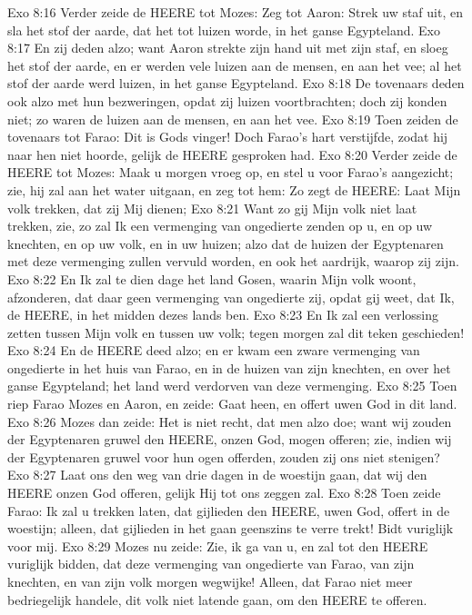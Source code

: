 Exo 8:16  Verder zeide de HEERE tot Mozes: Zeg tot Aaron: Strek uw staf uit, en sla het stof der aarde, dat het tot luizen worde, in het ganse Egypteland.
Exo 8:17  En zij deden alzo; want Aaron strekte zijn hand uit met zijn staf, en sloeg het stof der aarde, en er werden vele luizen aan de mensen, en aan het vee; al het stof der aarde werd luizen, in het ganse Egypteland.
Exo 8:18  De tovenaars deden ook alzo met hun bezweringen, opdat zij luizen voortbrachten; doch zij konden niet; zo waren de luizen aan de mensen, en aan het vee.
Exo 8:19  Toen zeiden de tovenaars tot Farao: Dit is Gods vinger! Doch Farao's hart verstijfde, zodat hij naar hen niet hoorde, gelijk de HEERE gesproken had.
Exo 8:20  Verder zeide de HEERE tot Mozes: Maak u morgen vroeg op, en stel u voor Farao's aangezicht; zie, hij zal aan het water uitgaan, en zeg tot hem: Zo zegt de HEERE: Laat Mijn volk trekken, dat zij Mij dienen;
Exo 8:21  Want zo gij Mijn volk niet laat trekken, zie, zo zal Ik een vermenging van ongedierte zenden op u, en op uw knechten, en op uw volk, en in uw huizen; alzo dat de huizen der Egyptenaren met deze vermenging zullen vervuld worden, en ook het aardrijk, waarop zij zijn.
Exo 8:22  En Ik zal te dien dage het land Gosen, waarin Mijn volk woont, afzonderen, dat daar geen vermenging van ongedierte zij, opdat gij weet, dat Ik, de HEERE, in het midden dezes lands ben.
Exo 8:23  En Ik zal een verlossing zetten tussen Mijn volk en tussen uw volk; tegen morgen zal dit teken geschieden!
Exo 8:24  En de HEERE deed alzo; en er kwam een zware vermenging van ongedierte in het huis van Farao, en in de huizen van zijn knechten, en over het ganse Egypteland; het land werd verdorven van deze vermenging.
Exo 8:25  Toen riep Farao Mozes en Aaron, en zeide: Gaat heen, en offert uwen God in dit land.
Exo 8:26  Mozes dan zeide: Het is niet recht, dat men alzo doe; want wij zouden der Egyptenaren gruwel den HEERE, onzen God, mogen offeren; zie, indien wij der Egyptenaren gruwel voor hun ogen offerden, zouden zij ons niet stenigen?
Exo 8:27  Laat ons den weg van drie dagen in de woestijn gaan, dat wij den HEERE onzen God offeren, gelijk Hij tot ons zeggen zal.
Exo 8:28  Toen zeide Farao: Ik zal u trekken laten, dat gijlieden den HEERE, uwen God, offert in de woestijn; alleen, dat gijlieden in het gaan geenszins te verre trekt! Bidt vuriglijk voor mij.
Exo 8:29  Mozes nu zeide: Zie, ik ga van u, en zal tot den HEERE vuriglijk bidden, dat deze vermenging van ongedierte van Farao, van zijn knechten, en van zijn volk morgen wegwijke! Alleen, dat Farao niet meer bedriegelijk handele, dit volk niet latende gaan, om den HEERE te offeren.
